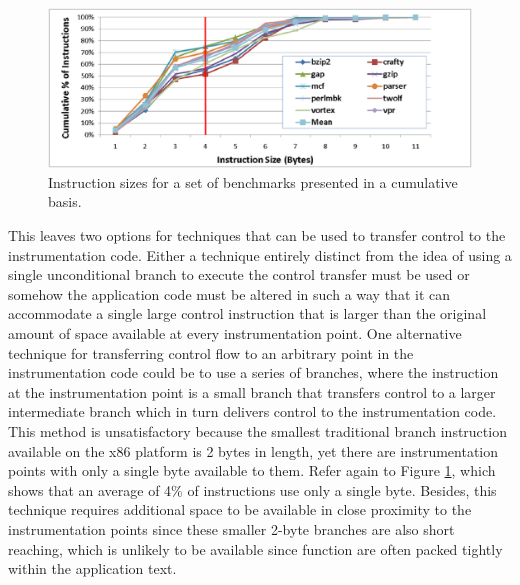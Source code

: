 \begin{figure}[ht]
\centering
\label{Figure:InstructionSizes}
\includegraphics[scale=0.5]{instsize.eps}
\caption{Instruction sizes for a set of benchmarks presented in a cumulative basis.}
\end{figure}

This leaves two options for techniques that can be used to transfer control to the instrumentation code.
Either a technique entirely distinct from the idea of using a single
unconditional branch to execute the control transfer must be used or somehow the application code must be altered
in such a way that it can accommodate a single large control instruction that is larger than
the original amount of space available at every instrumentation point. One alternative
technique for transferring control flow to an arbitrary point in the instrumentation code could be to use a series of branches,
where the instruction at the instrumentation point is a small branch that
transfers control to a larger intermediate branch which in turn delivers control to the instrumentation code. This
method is unsatisfactory because the smallest traditional branch instruction available
on the x86 platform is 2 bytes in length, yet there are
instrumentation points with only a single byte available to them. Refer again to Figure \ref{Figure:InstructionSizes}, which shows
that an average of 4\% of instructions use only a single byte.
Besides, this technique requires additional space to be available in close proximity to the instrumentation points since these
smaller 2-byte branches are also short reaching, which is unlikely to be available since function are often
packed tightly within the application text.

